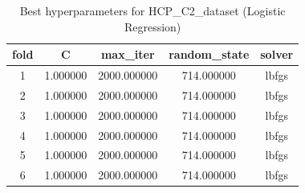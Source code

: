 \begin{table}[htbp]
\caption{Best hyperparameters for HCP_C2_dataset (Logistic Regression)}
\label{tab:best_hyperparams_HCP_C2_dataset}
\begin{tabular}{ccccc}
\toprule
fold & C & max_iter & random_state & solver \\
\midrule
1 & 1.000000 & 2000.000000 & 714.000000 & lbfgs \\
2 & 1.000000 & 2000.000000 & 714.000000 & lbfgs \\
3 & 1.000000 & 2000.000000 & 714.000000 & lbfgs \\
4 & 1.000000 & 2000.000000 & 714.000000 & lbfgs \\
5 & 1.000000 & 2000.000000 & 714.000000 & lbfgs \\
6 & 1.000000 & 2000.000000 & 714.000000 & lbfgs \\
\bottomrule
\end{tabular}
\end{table}
